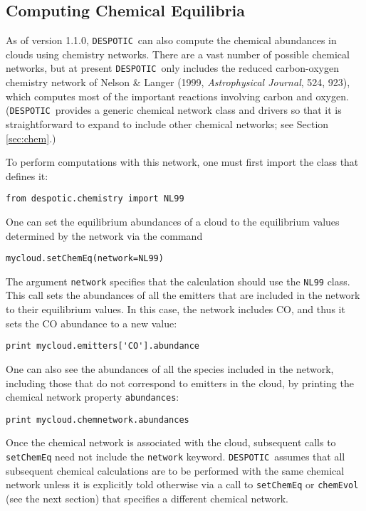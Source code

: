 \documentclass[12pt]{article}
\newcommand{\despotic}{\texttt{DESPOTIC}}
\begin{document}
\subsection{Computing Chemical Equilibria}

As of version 1.1.0, \despotic\ can also compute the chemical abundances in clouds using chemistry networks. There are a vast number of possible chemical networks, but at present \despotic\ only includes the reduced carbon-oxygen chemistry network of Nelson \& Langer (1999, \textit{Astrophysical Journal}, 524, 923), which computes most of the important reactions involving carbon and oxygen. (\despotic\ provides a generic chemical network class and drivers so that it is straightforward to expand to include other chemical networks; see Section \ref{sec:chem}.)

To perform computations with this network, one must first import the class that defines it:
\begin{verbatim}
from despotic.chemistry import NL99
\end{verbatim}
One can set the equilibrium abundances of a cloud to the equilibrium values determined by the network via the command
\begin{verbatim}
mycloud.setChemEq(network=NL99)
\end{verbatim}
The argument \verb=network= specifies that the calculation should use the \verb=NL99= class. This call sets the abundances of all the emitters that are included in the network to their equilibrium values. In this case, the network includes CO, and thus it sets the CO abundance to a new value:
\begin{verbatim}
print mycloud.emitters['CO'].abundance
\end{verbatim}

One can also see the abundances of all the species included in the network, including those that do not correspond to emitters in the cloud, by printing the chemical network property \verb=abundances=:
\begin{verbatim}
print mycloud.chemnetwork.abundances
\end{verbatim}
Once the chemical network is associated with the cloud, subsequent calls to \verb=setChemEq= need not include the \verb=network= keyword. \despotic\ assumes that all subsequent chemical calculations are to be performed with the same chemical network unless it is explicitly told otherwise via a call to \verb=setChemEq= or \verb=chemEvol= (see the next section) that specifies a different chemical network.
\end{document}

